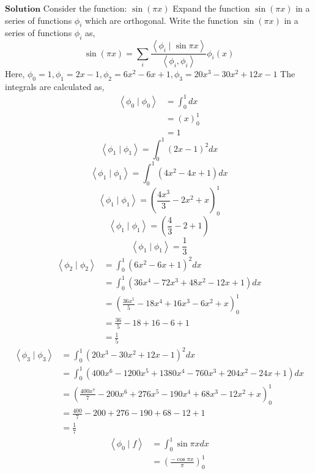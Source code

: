 \documentclass{article}
\begin{document}
\begin{flushleft}
$\boxed{\textbf{Solution}}$ Consider the function:
$\sin (\pi x)$
Expand the function $\sin (\pi x)$ in a series of functions $\phi_{i}$ which are orthogonal. Write the function $\sin (\pi x)$ in a series of functions $\phi_{i}$ as,
$$
\sin (\pi x)=\sum_{i} \frac{\left\langle\phi_{i} \mid \sin \pi x\right\rangle}{\left\langle\phi_{i}, \phi_{i}\right\rangle} \phi_{i}(x)
$$
Here, $\phi_{0}=1, \phi_{1}=2 x-1, \phi_{2}=6 x^{2}-6 x+1, \phi_{3}=20 x^{3}-30 x^{2}+12 x-1$
The integrals are calculated as,
$$
\begin{aligned}
\left\langle\phi_{0} \mid \phi_{0}\right\rangle &=\int_{0}^{1} d x \\
&=(x)_{0}^{1} \\
&=1
\end{aligned}
$$
$$
\left\langle\phi_{1} \mid \phi_{1}\right\rangle=\int_{0}^{1}(2 x-1)^{2} d x
$$
$$\left\langle\phi_{1} \mid \phi_{1}\right\rangle=\int_{0}^{1}\left(4 x^{2}-4 x+1\right) d x$$
$$\left\langle\phi_{1} \mid \phi_{1}\right\rangle=\left(\frac{4 x^{3}}{3}-2 x^{2}+x\right)_{0}^{1}$$
$$\left\langle\phi_{1} \mid \phi_{1}\right\rangle=\left(\frac{4}{3}-2+1\right)$$
$$\left\langle\phi_{1} \mid \phi_{1}\right\rangle=\frac{1}{3}$$
$$
\begin{aligned}
\left\langle\phi_{2} \mid \phi_{2}\right\rangle &=\int_{0}^{1}\left(6 x^{2}-6 x+1\right)^{2} d x \\
&=\int_{0}^{1}\left(36 x^{4}-72 x^{3}+48 x^{2}-12 x+1\right) d x \\
&=\left(\frac{36 x^{5}}{5}-18 x^{4}+16 x^{3}-6 x^{2}+x\right)_{0}^{1} \\
&=\frac{36}{5}-18+16-6+1 \\
&=\frac{1}{5}
\end{aligned}
$$
$$
\begin{aligned}
\left\langle\phi_{3} \mid \phi_{3}\right\rangle &=\int_{0}^{1}\left(20 x^{3}-30 x^{2}+12 x-1\right)^{2} d x \\
&=\int_{0}^{1}\left(400 x^{6}-1200 x^{5}+1380 x^{4}-760 x^{3}+204 x^{2}-24 x+1\right) d x \\
&=\left(\frac{400 x^{7}}{7}-200 x^{6}+276 x^{5}-190 x^{4}+68 x^{3}-12 x^{2}+x\right)_{0}^{1} \\
&=\frac{400}{7}-200+276-190+68-12+1 \\
&=\frac{1}{7}
\end{aligned}
$$
$$
\begin{aligned}
\left\langle\phi_{0} \mid f\right\rangle &=\int_{0}^{1} \sin \pi x d x \\
&=\left(\frac{-\cos \pi x}{\pi}\right)_{0}^{1} \\

\end{aligned}$$
\end{flushleft}
\end{document}
